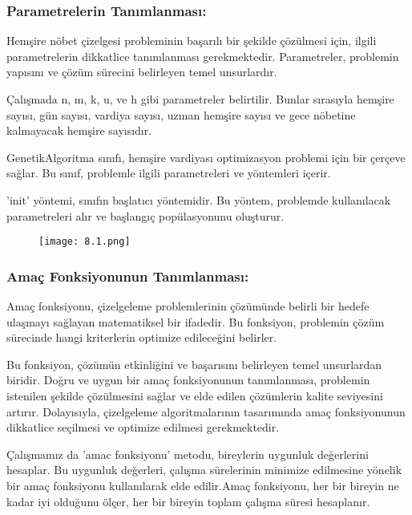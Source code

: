\documentclass[12pt, a4paper]{article}
\begin{document}
\begin{flushleft}
\subsubsection{Parametrelerin Tanımlanması:}
\item Hemşire nöbet çizelgesi probleminin başarılı bir şekilde çözülmesi için, ilgili parametrelerin dikkatlice tanımlanması gerekmektedir. Parametreler, problemin yapısını ve çözüm sürecini belirleyen temel unsurlardır.\\[5pt]
\item Çalışmada  n, m, k, u, ve h gibi parametreler belirtilir. Bunlar sırasıyla hemşire sayısı, gün sayısı, vardiya sayısı, uzman hemşire sayısı ve gece nöbetine kalmayacak hemşire sayısıdır.\\[10pt]
\item GenetikAlgoritma sınıfı, hemşire vardiyası optimizasyon problemi için bir çerçeve sağlar. Bu sınıf, problemle ilgili parametreleri ve yöntemleri içerir.\\[10pt]
\item 'init' yöntemi, sınıfın başlatıcı yöntemidir. Bu yöntem, problemde kullanılacak parametreleri alır ve başlangıç popülasyonunu oluşturur.\\[10pt]


\begin{figure}[!h]
	\centering
	\texttt{[image: 8.1.png]}
	
\end{figure}

\newpage

\subsubsection{Amaç Fonksiyonunun Tanımlanması: }
\item Amaç fonksiyonu, çizelgeleme problemlerinin çözümünde belirli bir hedefe ulaşmayı sağlayan matematiksel bir ifadedir. Bu fonksiyon, problemin çözüm sürecinde hangi kriterlerin optimize edileceğini belirler.
\item Bu fonksiyon, çözümün etkinliğini ve başarısını belirleyen temel unsurlardan biridir. Doğru ve uygun bir amaç fonksiyonunun tanımlanması, problemin istenilen şekilde çözülmesini sağlar ve elde edilen çözümlerin kalite seviyesini artırır. Dolayısıyla, çizelgeleme algoritmalarının tasarımında amaç fonksiyonunun dikkatlice seçilmesi ve optimize edilmesi gerekmektedir.
\item Çalışmamız da 'amac fonksiyonu' metodu, bireylerin uygunluk değerlerini hesaplar. Bu uygunluk değerleri, çalışma sürelerinin minimize edilmesine yönelik bir amaç fonksiyonu kullanılarak elde edilir.Amaç fonksiyonu, her bir bireyin ne kadar iyi olduğunu ölçer, her bir bireyin toplam çalışma süresi hesaplanır.\\[10pt]


\end{flushleft}
\end{document}
